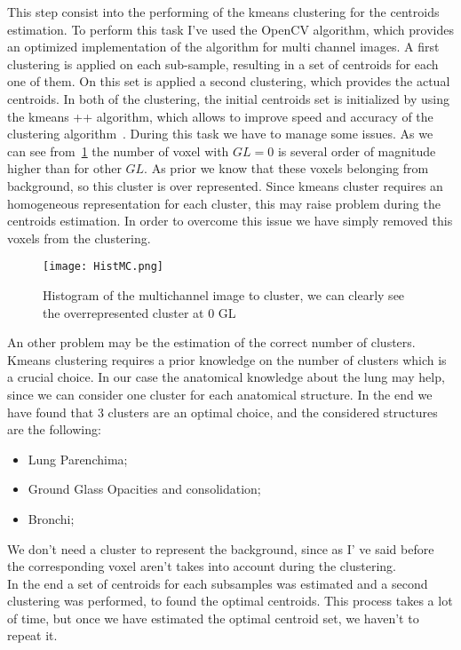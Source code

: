 		This step consist into the performing of the kmeans clustering for the centroids estimation. To perform this task I've used the OpenCV algorithm, which provides an optimized implementation of the algorithm for multi channel images. A first clustering is applied on each sub-sample, resulting in a set of centroids for each one of them. On this set is applied a second clustering, which provides the actual centroids. In both of the clustering, the initial centroids set is initialized by using the kmeans ++ algorithm, which allows to improve speed and accuracy of the clustering algorithm~\cite{Arthur2007}.
		During this task we have to manage some issues. As we can see from \figurename\,\ref{fig:ClusteringHistogram} the number of voxel with $GL = 0$  is several order of magnitude higher than for other $GL$. As prior we know that these voxels belonging from background, so this cluster is over represented. Since kmeans cluster requires an homogeneous representation for each cluster, this may raise problem during the centroids estimation. In order to overcome this issue we have simply removed this voxels from the clustering.  
		

		\begin{figure}[h!]
			\centering
				\texttt{[image: HistMC.png]}
					\label{fig:ClusteringHistogram}\caption{Histogram of the multichannel image to cluster, we can clearly see the overrepresented cluster at $0$ GL}
		\end{figure}
		
	An other problem may be the estimation of the correct number of clusters. Kmeans clustering requires a prior knowledge on the number of clusters which is a crucial choice. In our case the anatomical knowledge about the lung may help, since we can consider one cluster for each anatomical structure. In the end we have found that 3 clusters are an optimal choice, and the considered structures are the following: 
	\begin{itemize}
		\item Lung Parenchima;
		
		\item Ground Glass Opacities and consolidation;
		
		\item Bronchi;

	\end{itemize}

	
	We don't need a cluster to represent the background, since as I' ve said before the corresponding voxel aren't takes into account during the clustering.\\
	In the end a set of centroids for each subsamples was estimated and a second clustering was performed, to found the optimal centroids. 
	This process takes a lot of time, but once we have estimated the optimal centroid set, we haven't to repeat it.\\
	
